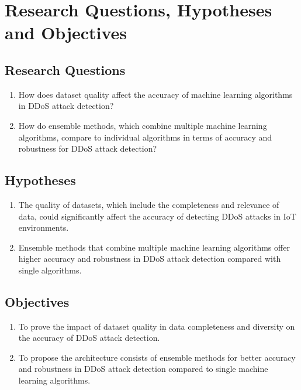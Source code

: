 \documentclass[a4paper, 12pt]{article}
\begin{document}
\section{Research Questions, Hypotheses and Objectives}

\subsection{Research Questions}
\begin{enumerate}
  \item How does dataset quality affect the accuracy of machine learning algorithms in DDoS attack detection?
  \item How do ensemble methods, which combine multiple machine learning algorithms, compare to individual algorithms in terms of accuracy and robustness for DDoS attack detection?
\end{enumerate}

\subsection{Hypotheses}
\begin{enumerate}
  \item The quality of datasets, which include the completeness and relevance of data, could significantly affect the accuracy of detecting DDoS attacks in IoT environments.
  \item Ensemble methods that combine multiple machine learning algorithms offer higher accuracy and robustness in DDoS attack detection compared with single algorithms.
\end{enumerate}

\subsection{Objectives}
\begin{enumerate}
  \item To prove the impact of dataset quality in data completeness and diversity on the accuracy of DDoS attack detection.
  \item To propose the architecture consists of ensemble methods for better accuracy and robustness in DDoS attack detection compared to single machine learning algorithms.
\end{enumerate}
\end{document}
